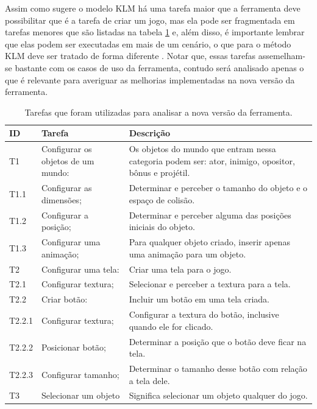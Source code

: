\documentclass[12pt,oneside,openright,a4paper,english,brazil,sumario=tradicional]{abntex2}
\begin{document}
Assim como sugere o modelo KLM \cite{klm-def} há uma tarefa maior que a ferramenta deve possibilitar que é a tarefa de criar um jogo, mas ela pode ser fragmentada em tarefas menores que são listadas na tabela \ref{table:tarefas} e, além disso, é importante lembrar que elas podem ser executadas em mais de um cenário, o que para o método KLM deve ser tratado de forma diferente \cite{klm-metodo}. Notar que, essas tarefas assemelham-se bastante com os casos de uso da ferramenta, contudo será analisado apenas o que é relevante para averiguar as melhorias implementadas na nova versão da ferramenta.

\begin{table}[h]
   \centering
   \begin{tabular}{| m{3em} | m{16em} | m{18em} |}
      \hline
      \textbf{ID} & \textbf{Tarefa} & \textbf{Descrição} \\
      \hline
      T1     & Configurar os objetos de um mundo:    & Os objetos do mundo que entram nessa categoria podem ser: ator, inimigo, opositor, bônus e projétil. \\
      \hline
      T1.1   & \hspace{2em} Configurar as dimensões; & Determinar e perceber o tamanho do objeto e o espaço de colisão. \\
      \hline
      T1.2   & \hspace{2em} Configurar a posição;    & Determinar e perceber alguma das posições iniciais do objeto. \\
      \hline
      T1.3   & \hspace{2em} Configurar uma animação; & Para qualquer objeto criado, inserir apenas uma animação para um objeto. \\
      \hline
      T2     & Configurar uma tela:                  & Criar uma tela para o jogo.\\
      \hline
      T2.1   & \hspace{2em} Configurar textura;      & Selecionar e perceber a textura para a tela.\\
      \hline
      T2.2   & \hspace{2em} Criar botão:             & Incluir um botão em uma tela criada.\\
      \hline
      T2.2.1 & \hspace{4em} Configurar textura;      & Configurar a textura do botão, inclusive quando ele for clicado. \\
      \hline
      T2.2.2 & \hspace{4em} Posicionar botão;        & Determinar a posição que o botão deve ficar na tela.\\
      \hline
      T2.2.3 & \hspace{4em} Configurar tamanho;      & Determinar o tamanho desse botão com relação a tela dele.\\
      \hline
      T3 & Selecionar um objeto & Significa selecionar um objeto qualquer do jogo. \\
      \hline
   \end{tabular}
   \caption{Tarefas que foram utilizadas para analisar a nova versão da ferramenta.}
   \label{table:tarefas}
\end{table}
\end{document}
